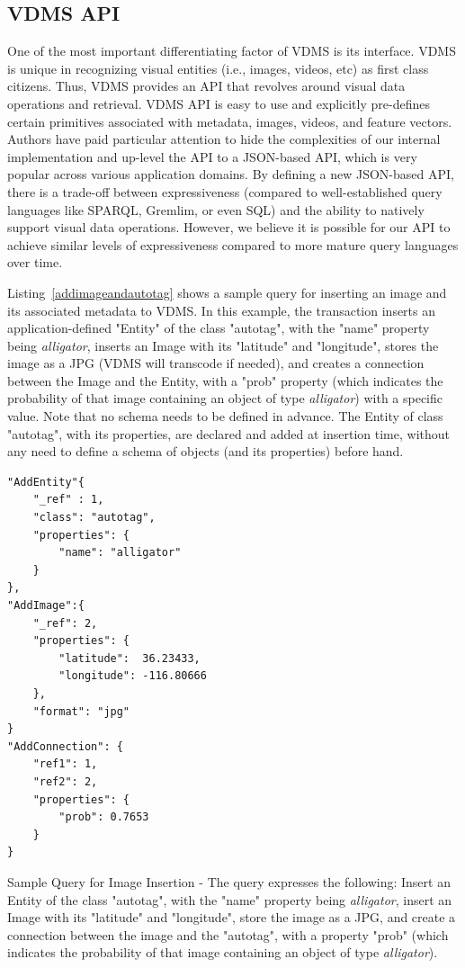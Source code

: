 \subsection{VDMS API}

One of the most important differentiating factor of VDMS is its interface.
VDMS is unique in recognizing visual entities (i.e., images, videos, etc)
as first class citizens. Thus, VDMS provides an API that revolves
around visual data operations and retrieval.
VDMS API is easy to use and explicitly pre-defines certain
primitives associated with metadata, images, videos, and feature vectors.
Authors have paid particular attention to hide the complexities of our internal
implementation and up-level the API to a JSON-based API,
which is very popular across various application domains.
By defining a new JSON-based API, there is a trade-off between expressiveness
(compared to well-established query languages like SPARQL, Gremlim, or even SQL)
and the ability to natively support visual data operations.
However, we believe it is possible for our API to achieve similar levels of
expressiveness compared to more mature query languages over time.

Listing~\ref{addimageandautotag} shows a sample query for inserting an image
and its associated metadata to VDMS.
In this example, the transaction inserts an application-defined "Entity" of
the class "autotag", with the "name" property being \textit{alligator},
inserts an Image with its "latitude" and "longitude",
stores the image  as a JPG (VDMS will transcode if needed),
and creates a connection between the Image and the Entity, with a "prob"
property (which indicates the probability of that image
containing an object of type  \textit{alligator}) with a specific value.
Note that no schema needs to be defined in advance.
The Entity of class "autotag", with its properties, are declared and added
at insertion time, without any need to define a schema of objects
(and its properties) before hand.

\begin{listing}[ht!]
\begin{verbatim}
"AddEntity"{
    "_ref" : 1,
    "class": "autotag",
    "properties": {
        "name": "alligator"
    }
},
"AddImage":{
    "_ref": 2,
    "properties": {
        "latitude":  36.23433,
        "longitude": -116.80666
    },
    "format": "jpg"
}
"AddConnection": {
    "ref1": 1,
    "ref2": 2,
    "properties": {
        "prob": 0.7653
    }
}

\end{verbatim}
\caption{Sample Query for Image Insertion -
The query expresses the following:
Insert an Entity of the class "autotag", with the "name" property being
\textit{alligator}, insert an Image with its "latitude" and "longitude",
store the image  as a JPG, and create a connection between
the image and the "autotag",  with a property "prob"
(which indicates the probability of that image
containing an object of type  \textit{alligator}).}
\label{addimageandautotag}
\end{listing}

